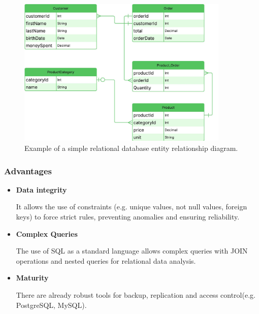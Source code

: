 \begin{figure}[H]
	\centering
	\includegraphics[width=0.9\textwidth, height=0.5\textheight, keepaspectratio]{Chapters/Figures/Databases/SQL.pdf}
	\caption{Example of a simple relational database entity relationship diagram. }
	\label{fig:databases:sql}
\end{figure}
\subsubsection{Advantages}

\begin{itemize}
	\item \textbf{Data integrity}

	      It allows the use of constraints (e.g. unique values, not null values,
	      foreign keys) to force strict rules, preventing anomalies and ensuring
	      reliability.

	\item \textbf{Complex Queries}

	      The use of SQL as a standard language allows complex queries with JOIN
	      operations and nested queries for relational data analysis.

	\item \textbf{Maturity}

	      There are already robust tools for backup, replication and access
	      control(e.g. PostgreSQL, MySQL).

\end{itemize}

